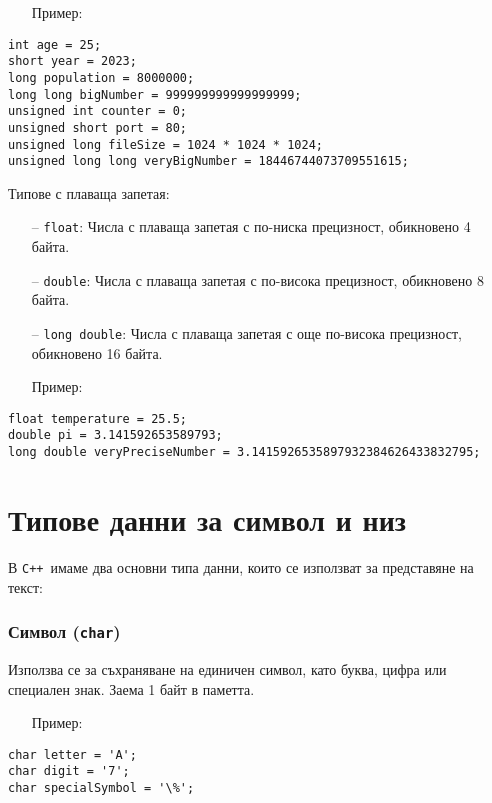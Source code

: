 \documentclass[oneside]{book}
\newcommand*{\code}[1]{\texttt{#1}}
\newcommand*{\cpp}{\texttt{C++}\ }
\begin{document}
\begin{itemize}\item[Пример:]\end{itemize}
\begin{mdframed}\begin{lstlisting}
int age = 25;
short year = 2023;
long population = 8000000;
long long bigNumber = 999999999999999999;
unsigned int counter = 0;
unsigned short port = 80;
unsigned long fileSize = 1024 * 1024 * 1024;
unsigned long long veryBigNumber = 18446744073709551615;
\end{lstlisting}\end{mdframed}

Типове с плаваща запетая:
\begin{itemize}
    \item[--] \code{float}: Числа с плаваща запетая с по-ниска прецизност, обикновено 4 байта.
    \item[--] \code{double}: Числа с плаваща запетая с по-висока прецизност, обикновено 8 байта.
    \item[--] \code{long double}: Числа с плаваща запетая с още по-висока прецизност, обикновено 16 байта.
\end{itemize}

\begin{itemize}\item[Пример:]\end{itemize}
\begin{mdframed}\begin{lstlisting}
float temperature = 25.5;
double pi = 3.141592653589793;
long double veryPreciseNumber = 3.1415926535897932384626433832795;
\end{lstlisting}\end{mdframed}

\section{Типове данни за символ и низ}
В \cpp имаме два основни типа данни, които се използват за представяне на текст:

\subsubsection{Символ (\code{char})}
Използва се за съхраняване на единичен символ, като буква, цифра или специален знак. Заема 1 байт в паметта.

\begin{itemize}\item[Пример:]\end{itemize}
\begin{mdframed}\begin{lstlisting}
char letter = 'A';
char digit = '7';
char specialSymbol = '\%';
\end{lstlisting}\end{mdframed}
\end{document}
